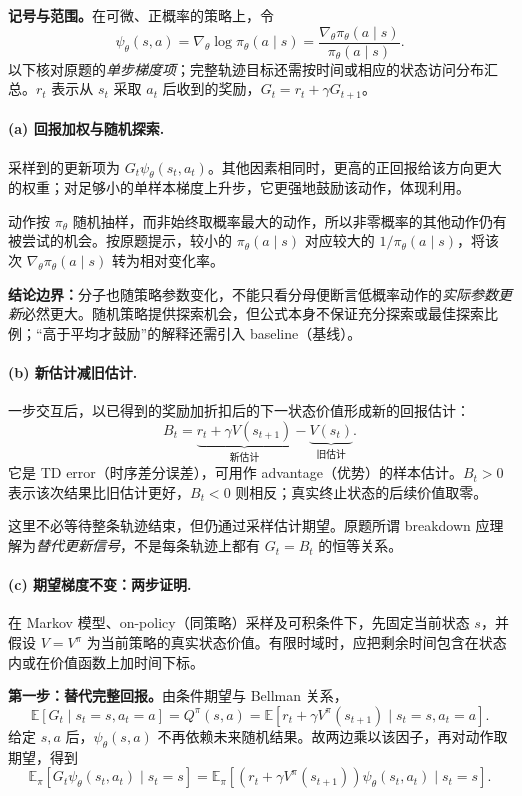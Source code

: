 \begin{checkedsolution}
\textbf{记号与范围。}在可微、正概率的策略上，令
\[
 \psi_\theta(s,a)=\nabla_\theta\log\pi_\theta(a\mid s)
 =\frac{\nabla_\theta\pi_\theta(a\mid s)}{\pi_\theta(a\mid s)}.
\]
以下核对原题的\emph{单步梯度项}；完整轨迹目标还需按时间或相应的状态访问分布汇总。$r_t$ 表示从 $s_t$ 采取 $a_t$ 后收到的奖励，$G_t=r_t+\gamma G_{t+1}$。

\paragraph{(a) 回报加权与随机探索.}
采样到的更新项为 $G_t\psi_\theta(s_t,a_t)$。其他因素相同时，更高的正回报给该方向更大的权重；对足够小的单样本梯度上升步，它更强地鼓励该动作，体现利用。

动作按 $\pi_\theta$ 随机抽样，而非始终取概率最大的动作，所以非零概率的其他动作仍有被尝试的机会。按原题提示，较小的 $\pi_\theta(a\mid s)$ 对应较大的 $1/\pi_\theta(a\mid s)$，将该次 $\nabla_\theta\pi_\theta(a\mid s)$ 转为相对变化率。

\textbf{结论边界：}分子也随策略参数变化，不能只看分母便断言低概率动作的\emph{实际参数更新}必然更大。随机策略提供探索机会，但公式本身不保证充分探索或最佳探索比例；“高于平均才鼓励”的解释还需引入 baseline（基线）。

\paragraph{(b) 新估计减旧估计.}
一步交互后，以已得到的奖励加折扣后的下一状态价值形成新的回报估计：
\[
 \boxed{B_t=\underbrace{r_t+\gamma V(s_{t+1})}_{\text{新估计}}
             -\underbrace{V(s_t)}_{\text{旧估计}}}.
\]
它是 TD error（时序差分误差），可用作 advantage（优势）的样本估计。$B_t>0$ 表示该次结果比旧估计更好，$B_t<0$ 则相反；真实终止状态的后续价值取零。

这里不必等待整条轨迹结束，但仍通过采样估计期望。原题所谓 breakdown 应理解为\emph{替代更新信号}，不是每条轨迹上都有 $G_t=B_t$ 的恒等关系。

\paragraph{(c) 期望梯度不变：两步证明.}
在 Markov 模型、on-policy（同策略）采样及可积条件下，先固定当前状态 $s$，并假设 $V=V^\pi$ 为当前策略的真实状态价值。有限时域时，应把剩余时间包含在状态内或在价值函数上加时间下标。

\textbf{第一步：替代完整回报。}由条件期望与 Bellman 关系，
\[
 \mathbb E[G_t\mid s_t=s,a_t=a]
 =Q^\pi(s,a)
 =\mathbb E[r_t+\gamma V^\pi(s_{t+1})\mid s_t=s,a_t=a].
\]
给定 $s,a$ 后，$\psi_\theta(s,a)$ 不再依赖未来随机结果。故两边乘以该因子，再对动作取期望，得到
\[
 \mathbb E_\pi[G_t\psi_\theta(s_t,a_t)\mid s_t=s]
 =\mathbb E_\pi[(r_t+\gamma V^\pi(s_{t+1}))\psi_\theta(s_t,a_t)\mid s_t=s].
\]


\end{checkedsolution}
